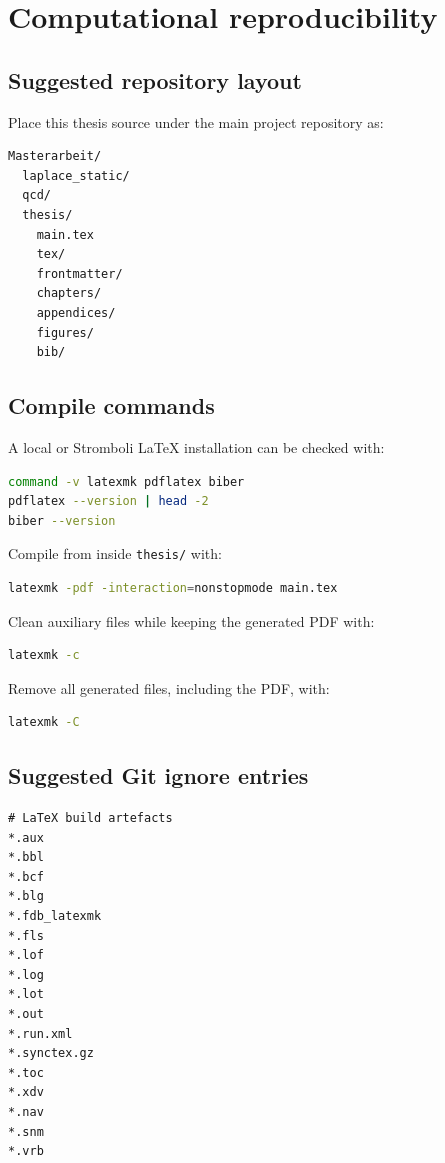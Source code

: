 \chapter{Computational reproducibility}
\label{app:reproducibility}

\section{Suggested repository layout}
Place this thesis source under the main project repository as:
\begin{lstlisting}[language=bash]
Masterarbeit/
  laplace_static/
  qcd/
  thesis/
    main.tex
    tex/
    frontmatter/
    chapters/
    appendices/
    figures/
    bib/
\end{lstlisting}

\section{Compile commands}
A local or Stromboli LaTeX installation can be checked with:
\begin{lstlisting}[language=bash]
command -v latexmk pdflatex biber
pdflatex --version | head -2
biber --version
\end{lstlisting}
Compile from inside \texttt{thesis/} with:
\begin{lstlisting}[language=bash]
latexmk -pdf -interaction=nonstopmode main.tex
\end{lstlisting}
Clean auxiliary files while keeping the generated PDF with:
\begin{lstlisting}[language=bash]
latexmk -c
\end{lstlisting}
Remove all generated files, including the PDF, with:
\begin{lstlisting}[language=bash]
latexmk -C
\end{lstlisting}

\section{Suggested Git ignore entries}
\begin{lstlisting}
# LaTeX build artefacts
*.aux
*.bbl
*.bcf
*.blg
*.fdb_latexmk
*.fls
*.lof
*.log
*.lot
*.out
*.run.xml
*.synctex.gz
*.toc
*.xdv
*.nav
*.snm
*.vrb
\end{lstlisting}
